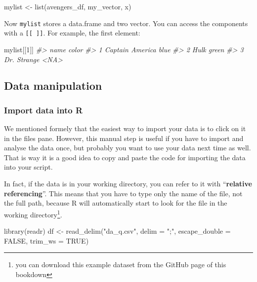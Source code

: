 \documentclass[
]{article}
\newenvironment{Shaded}{\begin{snugshade}}{\end{snugshade}}
\newcommand{\AttributeTok}[1]{\textcolor[rgb]{0.77,0.63,0.00}{#1}}
\newcommand{\CommentTok}[1]{\textcolor[rgb]{0.56,0.35,0.01}{\textit{#1}}}
\newcommand{\ConstantTok}[1]{\textcolor[rgb]{0.00,0.00,0.00}{#1}}
\newcommand{\DecValTok}[1]{\textcolor[rgb]{0.00,0.00,0.81}{#1}}
\newcommand{\FunctionTok}[1]{\textcolor[rgb]{0.00,0.00,0.00}{#1}}
\newcommand{\NormalTok}[1]{#1}
\newcommand{\OtherTok}[1]{\textcolor[rgb]{0.56,0.35,0.01}{#1}}
\newcommand{\StringTok}[1]{\textcolor[rgb]{0.31,0.60,0.02}{#1}}
\begin{document}
\begin{Shaded}
\begin{Highlighting}[]
\NormalTok{mylist }\OtherTok{\textless{}{-}} \FunctionTok{list}\NormalTok{(avengers\_df, my\_vector, x)}
\end{Highlighting}
\end{Shaded}

Now \texttt{mylist} stores a data.frame and two vector. You can access the components with a \texttt{{[}{[}\ {]}{]}}. For example, the first element:

\begin{Shaded}
\begin{Highlighting}[]
\NormalTok{mylist[[}\DecValTok{1}\NormalTok{]]}
\CommentTok{\#\textgreater{}              name color}
\CommentTok{\#\textgreater{} 1 Captain America  blue}
\CommentTok{\#\textgreater{} 2            Hulk green}
\CommentTok{\#\textgreater{} 3     Dr. Strange  \textless{}NA\textgreater{}}
\end{Highlighting}
\end{Shaded}

\hypertarget{data-manipulation}{%
\subsection{Data manipulation}\label{data-manipulation}}

\hypertarget{import-data-into-r}{%
\subsubsection{Import data into R}\label{import-data-into-r}}

We mentioned formely that the easiest way to import your data is to click on it in the files pane. However, this manual step is useful if you have to import and analyse the data once, but probably you want to use your data next time as well. That is way it is a good idea to copy and paste the code for importing the data into your script.

In fact, if the data is in your working directory, you can refer to it with ``\textbf{relative referencing}''. This means that you have to type only the name of the file, not the full path, because R will automatically start to look for the file in the working directory\footnote{you can download this example dataset from the GitHub page of this bookdown}.

\begin{Shaded}
\begin{Highlighting}[]
\FunctionTok{library}\NormalTok{(readr)}
\NormalTok{df }\OtherTok{\textless{}{-}} \FunctionTok{read\_delim}\NormalTok{(}\StringTok{"da\_q.csv"}\NormalTok{, }\AttributeTok{delim =} \StringTok{";"}\NormalTok{, }\AttributeTok{escape\_double =} \ConstantTok{FALSE}\NormalTok{, }\AttributeTok{trim\_ws =} \ConstantTok{TRUE}\NormalTok{)}
\end{Highlighting}
\end{Shaded}
\end{document}
